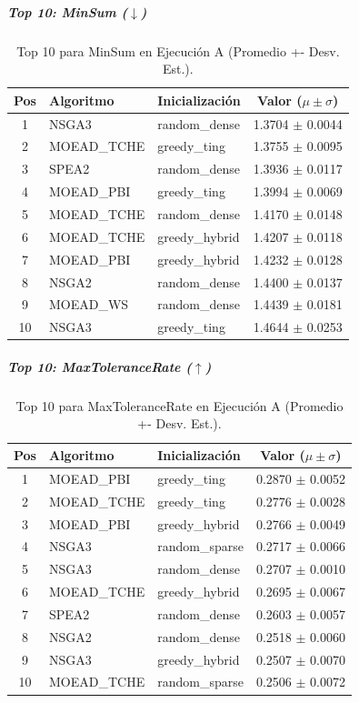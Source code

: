 \documentclass[a4paper,10pt]{article}
\begin{document}
\subparagraph{Top 10: MinSum ($\downarrow$)}
\begin{table}[H]
    \centering
    \begin{tabular}{cllc}
        \toprule
        Pos & Algoritmo & Inicialización & Valor ($\mu \pm \sigma$) \\
        \midrule
        1 & NSGA3 & random\_dense & 1.3704 $\pm$ 0.0044 \\
        2 & MOEAD\_TCHE & greedy\_ting & 1.3755 $\pm$ 0.0095 \\
        3 & SPEA2 & random\_dense & 1.3936 $\pm$ 0.0117 \\
        4 & MOEAD\_PBI & greedy\_ting & 1.3994 $\pm$ 0.0069 \\
        5 & MOEAD\_TCHE & random\_dense & 1.4170 $\pm$ 0.0148 \\
        6 & MOEAD\_TCHE & greedy\_hybrid & 1.4207 $\pm$ 0.0118 \\
        7 & MOEAD\_PBI & greedy\_hybrid & 1.4232 $\pm$ 0.0128 \\
        8 & NSGA2 & random\_dense & 1.4400 $\pm$ 0.0137 \\
        9 & MOEAD\_WS & random\_dense & 1.4439 $\pm$ 0.0181 \\
        10 & NSGA3 & greedy\_ting & 1.4644 $\pm$ 0.0253 \\
        \bottomrule
    \end{tabular}
    \caption{Top 10 para MinSum en Ejecución A (Promedio +- Desv. Est.).}
\end{table}

\subparagraph{Top 10: MaxToleranceRate ($\uparrow$)}
\begin{table}[H]
    \centering
    \begin{tabular}{cllc}
        \toprule
        Pos & Algoritmo & Inicialización & Valor ($\mu \pm \sigma$) \\
        \midrule
        1 & MOEAD\_PBI & greedy\_ting & 0.2870 $\pm$ 0.0052 \\
        2 & MOEAD\_TCHE & greedy\_ting & 0.2776 $\pm$ 0.0028 \\
        3 & MOEAD\_PBI & greedy\_hybrid & 0.2766 $\pm$ 0.0049 \\
        4 & NSGA3 & random\_sparse & 0.2717 $\pm$ 0.0066 \\
        5 & NSGA3 & random\_dense & 0.2707 $\pm$ 0.0010 \\
        6 & MOEAD\_TCHE & greedy\_hybrid & 0.2695 $\pm$ 0.0067 \\
        7 & SPEA2 & random\_dense & 0.2603 $\pm$ 0.0057 \\
        8 & NSGA2 & random\_dense & 0.2518 $\pm$ 0.0060 \\
        9 & NSGA3 & greedy\_hybrid & 0.2507 $\pm$ 0.0070 \\
        10 & MOEAD\_TCHE & random\_sparse & 0.2506 $\pm$ 0.0072 \\
        \bottomrule
    \end{tabular}
    \caption{Top 10 para MaxToleranceRate en Ejecución A (Promedio +- Desv. Est.).}
\end{table}
\end{document}

